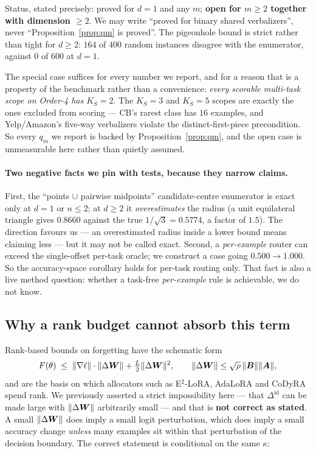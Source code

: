 \noindent Status, stated precisely: proved for $d=1$ and any $m$; \textbf{open for
$m\ge2$ together with dimension $\ge2$}. We may write ``proved for binary shared
verbalizers'', never ``Proposition~\ref{prop:qm} is proved''. The pigeonhole bound
is strict rather than tight for $d\ge2$: $164$ of $400$ random instances disagree
with the enumerator, against $0$ of $600$ at $d=1$.

The special case suffices for every number we report, and for a reason that is a
property of the benchmark rather than a convenience: \emph{every scorable
multi-task scope on Order-4 has $K_S=2$}. The $K_S=3$ and $K_S=5$ scopes are
exactly the ones excluded from scoring --- CB's rarest class has $16$ examples, and
Yelp/Amazon's five-way verbalizers violate the distinct-first-piece precondition.
So every $q_m$ we report is backed by Proposition~\ref{prop:qm}, and the open case
is unmeasurable here rather than quietly assumed.

\paragraph{Two negative facts we pin with tests, because they narrow claims.}
First, the ``points $\cup$ pairwise midpoints'' candidate-centre enumerator is
exact only at $d=1$ or $n\le2$; at $d\ge2$ it \emph{overestimates} the radius (a
unit equilateral triangle gives $0.8660$ against the true $1/\sqrt3=0.5774$, a
factor of $1.5$). The direction favours us --- an overestimated radius inside a
lower bound means claiming less --- but it may not be called exact. Second, a
\emph{per-example} router can exceed the single-offset per-task oracle; we
construct a case going $0.500\to1.000$. So the accuracy-space corollary holds for
per-task routing only. That fact is also a live method question: whether a
task-free \emph{per-example} rule is achievable, we do not know.

\subsection{Why a rank budget cannot absorb this term}

Rank-based bounds on forgetting have the schematic form
\begin{equation}
  F(\theta)\;\le\;\|\nabla\ell\|\cdot\|\Delta\bm{W}\|+\tfrac{L}{2}\|\Delta\bm{W}\|^2,
  \qquad \|\Delta\bm{W}\|\le\sqrt{\rho}\,\|\bm{B}\|\|\bm{A}\|,
  \label{eq:rankbound}
\end{equation}
and are the basis on which allocators such as E$^2$-LoRA, AdaLoRA and CoDyRA spend
rank. We previously asserted a strict impossibility here --- that
$\Delta^{\mathrm{id}}$ can be made large with $\|\Delta\bm{W}\|$ arbitrarily small ---
and that is \textbf{not correct as stated}. A small $\|\Delta\bm{W}\|$ does imply a
small logit perturbation, which does imply a small accuracy change \emph{unless}
many examples sit within that perturbation of the decision boundary. The correct
statement is conditional on the same $\kappa$:

